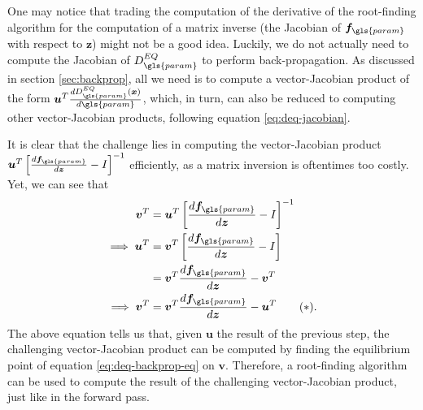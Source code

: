 One may notice that trading the computation of the derivative of the root-finding algorithm for the computation of a matrix inverse (the Jacobian of $\bm{f}_{\gls{param}}$ with respect to $\bm{z}$) might not be a good idea.
Luckily, we do not actually need to compute the Jacobian of $D^{EQ}_{\gls{param}}$ to perform back-propagation.
As discussed in section \ref{sec:backprop}, all we need is to compute a vector-Jacobian product of the form $\bm{u}^T\frac{d D^{EQ}_{\gls{param}}(\bm{x})}{d \gls{param}}$, which, in turn, can also be reduced to computing other vector-Jacobian products, following equation \eqref{eq:deq-jacobian}.

It is clear that the challenge lies in computing the vector-Jacobian product $\bm{u}^T\left[ \frac{d \bm{f}_{\gls{param}}}{d \bm{z}} - I \right]^{-1}$ efficiently, as a matrix inversion is oftentimes too costly.
Yet, we can see that
\begin{align*}
    \bm{v}^T &= \bm{u}^T\left[ \frac{d \bm{f}_{\gls{param}}}{d \bm{z}} - I \right]^{-1} \\
    \implies \bm{u}^T &= \bm{v}^T\left[ \frac{d \bm{f}_{\gls{param}}}{d \bm{z}} - I \right] \\
		      &= \bm{v}^T \frac{d \bm{f}_{\gls{param}}}{d \bm{z}} - \bm{v}^T \\
    \implies \bm{v}^T &= \bm{v}^T \frac{d \bm{f}_{\gls{param}}}{d \bm{z}} - \bm{u}^T \tag{$*$}\label{eq:deq-backprop-eq}
.\end{align*}
The above equation tells us that, given $\bm{u}$ the result of the previous step, the challenging vector-Jacobian product can be computed by finding the equilibrium point of equation \eqref{eq:deq-backprop-eq} on $\bm{v}$.
Therefore, a root-finding algorithm can be used to compute the result of the challenging vector-Jacobian product, just like in the forward pass.

